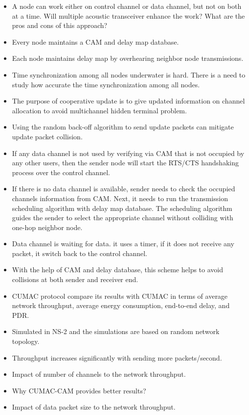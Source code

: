 \documentclass{article}
\begin{document}
\begin{itemize}
  \item A node can work either on control channel or data channel, but not on both at a time. Will multiple acoustic transceiver enhance the work? What are the pros and cons of this approach?
  \item Every node maintains a CAM and delay map database.
  \item Each node maintains delay map by overhearing neighbor node transmissions.
  \item Time synchronization among all nodes underwater is hard. There is a need to study how accurate the time synchronization among all nodes.
  \item The purpose of cooperative update is to give updated information on channel allocation to avoid multichannel hidden terminal problem.
  \item Using the random back-off algorithm to send update packets can mitigate update packet collision.
  \item If any data channel is not used by verifying via CAM that is not occupied by any other users, then the sender node will start the RTS/CTS handshaking process over the control channel.
  \item If there is no data channel is available, sender needs to check the occupied channels information from CAM. Next, it needs to run the transmission scheduling algorithm with delay map database. The scheduling algorithm  guides the sender to select the appropriate channel without colliding with one-hop neighbor node.
  \item Data channel is waiting for data. it uses a timer, if it does not receive any packet, it switch back to the control channel. 
  \item With the help of CAM and delay database, this scheme helps to avoid collisions at both sender and receiver end.
  \item CUMAC protocol compare its results with CUMAC in terms of average network throughput, average energy consumption, end-to-end delay, and PDR.
  \item Simulated in NS-2 and the simulations are based on random network topology. 
  \item Throughput increases significantly with sending more packets/second.
  \item Impact of number of channels to the network throughput.
  \item Why CUMAC-CAM provides better results?
  \item Impact of data packet size to the network throughput.

\end{itemize}
\end{document}
